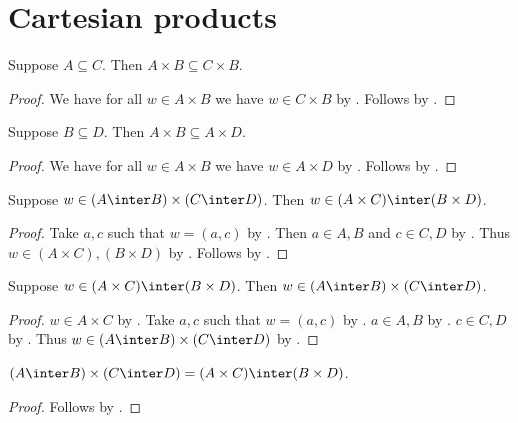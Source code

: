 

\section{Cartesian products}

\begin{proposition}\label{times_subseteq_left}
    Suppose $A\subseteq C$. Then $A\times B\subseteq C\times B$.
\end{proposition}
\begin{proof}
    We have for all $w\in A\times B$ we have $w\in C\times B$
        by .
    Follows by .
\end{proof}

\begin{proposition}\label{times_subseteq_right}
    Suppose $B\subseteq D$. Then $A\times B\subseteq A\times D$.
\end{proposition}
\begin{proof}
    We have for all $w\in A\times B$ we have $w\in A\times D$
        by .
    Follows by .
\end{proof}

\begin{proposition}\label{inter_times_intro}
    Suppose $w\in(A\inter B)\times (C\inter D)$.
    Then $w\in(A\times C)\inter (B\times D)$.
\end{proposition}
\begin{proof}
    Take $a,c$ such that $w = (a, c)$
        by .
    Then $a\in A, B$ and $c\in C,D$
        by .
    Thus $w\in (A\times C), (B\times D)$ by .
    Follows by .
\end{proof}

\begin{proposition}\label{inter_times_elim}
    Suppose $w\in(A\times C)\inter (B\times D)$.
    Then $w\in(A\inter B)\times (C\inter D)$.
\end{proposition}
\begin{proof}
    $w\in A\times C$ by .
    Take $a, c$ such that $w = (a, c)$ by .
    $a\in A, B$ by .
    $c\in C, D$ by .
    Thus $w \in (A\inter B)\times (C\inter D)$
        by .
\end{proof}

\begin{proposition}\label{inter_times}
    $(A\inter B)\times (C\inter D) = (A\times C)\inter (B\times D)$.
\end{proposition}
\begin{proof}
    Follows by .
\end{proof}


